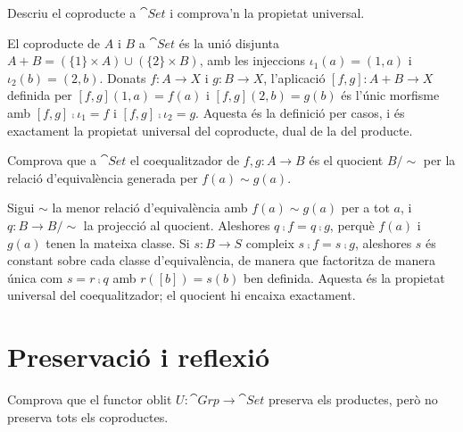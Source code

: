 \begin{exercici}
Descriu el coproducte a $\cat{Set}$ i comprova'n la propietat universal.
\end{exercici}

\begin{solucio}
El coproducte de $A$ i $B$ a $\cat{Set}$ és la unió disjunta $A+B=(\{1\}\times A)\cup(\{2\}\times B)$, amb les injeccions $\iota_1(a)=(1,a)$ i $\iota_2(b)=(2,b)$. Donats $f\colon A\to X$ i $g\colon B\to X$, l'aplicació $[f,g]\colon A+B\to X$ definida per $[f,g](1,a)=f(a)$ i $[f,g](2,b)=g(b)$ és l'únic morfisme amb $[f,g]\comp\iota_1=f$ i $[f,g]\comp\iota_2=g$. Aquesta és la definició per casos, i és exactament la propietat universal del coproducte, dual de la del producte.
\end{solucio}

\begin{exercici}
Comprova que a $\cat{Set}$ el coequalitzador de $f,g\colon A\to B$ és el quocient $B/{\sim}$ per la relació d'equivalència generada per $f(a)\sim g(a)$.
\end{exercici}

\begin{solucio}
Sigui $\sim$ la menor relació d'equivalència amb $f(a)\sim g(a)$ per a tot $a$, i $q\colon B\to B/{\sim}$ la projecció al quocient. Aleshores $q\comp f=q\comp g$, perquè $f(a)$ i $g(a)$ tenen la mateixa classe. Si $s\colon B\to S$ compleix $s\comp f=s\comp g$, aleshores $s$ és constant sobre cada classe d'equivalència, de manera que factoritza de manera única com $s=r\comp q$ amb $r([b])=s(b)$ ben definida. Aquesta és la propietat universal del coequalitzador; el quocient hi encaixa exactament.
\end{solucio}

\section{Preservació i reflexió}

\begin{exercici}
Comprova que el functor oblit $U\colon\cat{Grp}\to\cat{Set}$ preserva els productes, però no preserva tots els coproductes.
\end{exercici}

